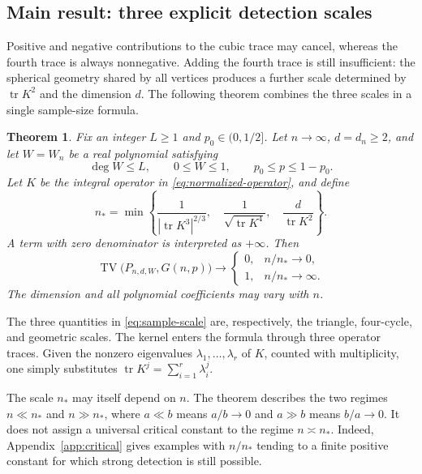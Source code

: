 \documentclass[11pt,reqno]{amsart}
\numberwithin{equation}{section}
\newtheorem{theorem}{Theorem}[section]
\theoremstyle{definition}
\theoremstyle{remark}
\theoremstyle{definition}
\DeclareMathOperator{\tr}{tr}
\DeclareMathOperator{\TV}{TV}
\begin{document}
\subsection{Main result: three explicit detection scales}
Positive and negative contributions to the cubic trace may cancel, whereas the fourth trace is always nonnegative.
Adding the fourth trace is still insufficient: the spherical geometry shared by all vertices produces a further scale determined by
$\tr K^2$ and the dimension $d$.
The following theorem combines the three scales in a single sample-size formula.

\begin{theorem}\label{thm:main}
Fix an integer $L\ge1$ and $p_0\in(0,1/2]$.
Let $n\to\infty$, $d=d_n\ge2$, and let $W=W_n$ be a real polynomial satisfying
\[
 \deg W\le L,\qquad 0\le W\le1,\qquad p_0\le p\le1-p_0.
\]
Let $K$ be the integral operator in \eqref{eq:normalized-operator}, and define
\begin{equation}\label{eq:sample-scale}
 n_*=
 \min\left\{
 \frac{1}{|\tr K^3|^{2/3}},\quad
 \frac{1}{\sqrt{\tr K^4}},\quad
 \frac{d}{\tr K^2}
 \right\}.
\end{equation}
A term with zero denominator is interpreted as $+\infty$. Then
\begin{equation}\label{eq:main-theorem}
 \TV\bigl(P_{n,d,W},G(n,p)\bigr)\longrightarrow
 \begin{cases}
 0,& n/n_*\longrightarrow0,\\[2pt]
 1,& n/n_*\longrightarrow\infty.
 \end{cases}
\end{equation}
The dimension and all polynomial coefficients may vary with $n$.
\end{theorem}

The three quantities in \eqref{eq:sample-scale} are, respectively, the triangle, four-cycle, and geometric scales.
The kernel enters the formula through three operator traces. Given the nonzero eigenvalues $\lambda_1,\ldots,\lambda_r$ of $K$, counted with multiplicity,
one simply substitutes $\tr K^j=\sum_{i=1}^r\lambda_i^j$.

The scale $n_*$ may itself depend on $n$.
The theorem describes the two regimes $n\ll n_*$ and $n\gg n_*$,
where $a\ll b$ means $a/b\to0$ and $a\gg b$ means $b/a\to0$.
It does not assign a universal critical constant to the regime $n\asymp n_*$.
Indeed, Appendix~\ref{app:critical} gives examples with $n/n_*$ tending to a finite positive constant for which strong detection is still possible.
\end{document}
